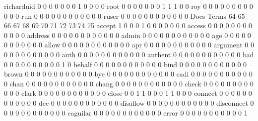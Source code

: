 \documentclass[compress,8pt]{beamer}
\begin{document}
\begin{frame}
\begin{Schunk}
  richarduid                                0  0  0  0  0  0  0  1  0  0  0  0
  root                                      0  0  0  0  0  0  0  1  1  1  0  0
  roy                                       0  0  0  0  0  0  0  0  0  0  0  0
  run                                       0  0  0  0  0  0  0  0  0  0  0  0
  ruser                                     0  0  0  0  0  0  0  0  0  0  0  0
                                          Docs
Terms                                      64 65 66 67 68 69 70 71 72 73 74 75
  accept                                    1  0  0  0  1  0  0  0  0  0  0  0
  access                                    0  0  0  0  0  0  0  0  0  0  0  0
  address                                   0  0  0  0  0  0  0  0  0  0  0  0
  admin                                     0  0  0  0  0  0  0  0  0  0  0  0
  age                                       0  0  0  0  0  0  0  0  0  0  0  0
  allow                                     0  0  0  0  0  0  0  0  0  0  0  0
  apr                                       0  0  0  0  0  0  0  0  0  0  0  0
  argument                                  0  0  0  0  0  0  0  0  0  0  0  0
  auth                                      0  0  0  0  0  0  0  0  0  0  0  0
  authent                                   0  0  0  0  0  0  0  0  0  0  0  0
  bad                                       0  0  0  0  0  0  0  0  0  0  1  0
  behalf                                    0  0  0  0  0  0  0  0  0  0  0  0
  bind                                      0  0  0  0  0  0  0  0  0  0  0  0
  brown                                     0  0  0  0  0  0  0  0  0  0  0  0
  bye                                       0  0  0  0  0  0  0  0  0  0  0  0
  cadi                                      0  0  0  0  0  0  0  0  0  0  0  0
  chan                                      0  0  0  0  0  0  0  0  0  0  0  0
  chang                                     0  0  0  0  0  0  0  0  0  0  0  0
  check                                     0  0  0  0  0  0  0  0  0  0  0  0
  clark                                     0  0  0  0  0  0  0  0  0  0  0  0
  close                                     0  0  1  1  0  0  0  1  1  0  0  0
  connect                                   0  0  0  0  0  0  0  0  0  0  0  0
  dec                                       0  0  0  0  0  0  0  0  0  0  0  0
  disallow                                  0  0  0  0  0  0  0  0  0  0  0  0
  disconnect                                0  0  0  0  0  0  0  0  0  0  0  0
  eaguilar                                  0  0  0  0  0  0  0  0  0  0  0  0
  error                                     0  0  0  0  0  0  0  0  0  0  0  1

\end{Schunk}
\end{frame}
\end{document}
